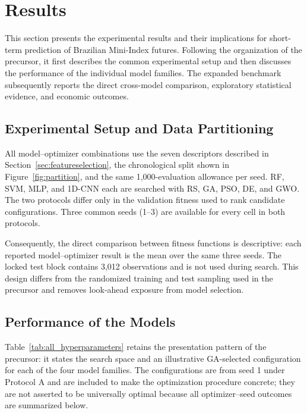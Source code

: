 \section{Results}\label{sec:results}

This section presents the experimental results and their implications for short-term prediction of Brazilian Mini-Index futures. Following the organization of the precursor, it first describes the common experimental setup and then discusses the performance of the individual model families. The expanded benchmark subsequently reports the direct cross-model comparison, exploratory statistical evidence, and economic outcomes.

\subsection{Experimental Setup and Data Partitioning}

All model--optimizer combinations use the seven descriptors described in Section~\ref{sec:featureselection}, the chronological split shown in Figure~\ref{fig:partition}, and the same 1,000-evaluation allowance per seed. RF, SVM, MLP, and 1D-CNN each are searched with RS, GA, PSO, DE, and GWO. The two protocols differ only in the validation fitness used to rank candidate configurations. Three common seeds (1--3) are available for every cell in both protocols.

Consequently, the direct comparison between fitness functions is descriptive: each reported model--optimizer result is the mean over the same three seeds. The locked test block contains 3,012 observations and is not used during search. This design differs from the randomized training and test sampling used in the precursor and removes look-ahead exposure from model selection.

\subsection{Performance of the Models}
\label{sec:performance_models}

Table~\ref{tab:all_hyperparameters} retains the presentation pattern of the precursor: it states the search space and an illustrative GA-selected configuration for each of the four model families. The configurations are from seed 1 under Protocol A and are included to make the optimization procedure concrete; they are not asserted to be universally optimal because all optimizer--seed outcomes are summarized below.

